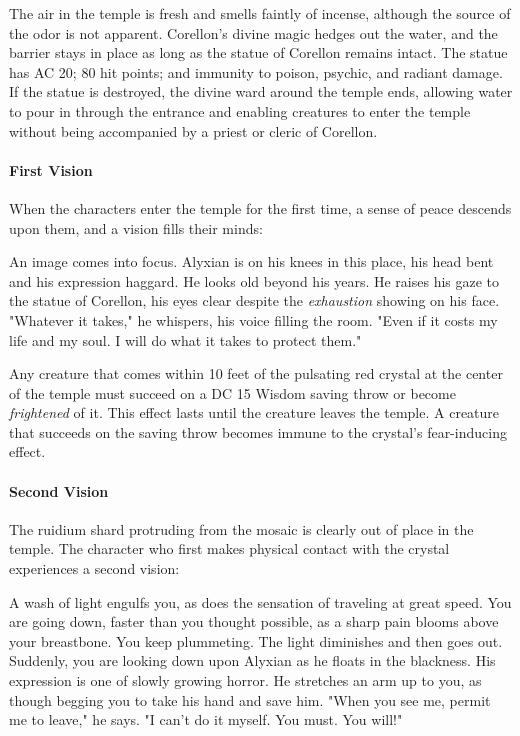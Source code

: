 \documentclass[letterpaper, 11pt, bg=full, twocolumn]{dndbook}
\begin{document}
The air in the temple is fresh and smells faintly of incense, although the source of the odor is not apparent. Corellon's divine magic hedges out the water, and the barrier stays in place as long as the statue of Corellon remains intact. The statue has AC 20; 80 hit points; and immunity to poison, psychic, and radiant damage. If the statue is destroyed, the divine ward around the temple ends, allowing water to pour in through the entrance and enabling creatures to enter the temple without being accompanied by a priest or cleric of Corellon.

\paragraph{First Vision}

When the characters enter the temple for the first time, a sense of peace descends upon them, and a vision fills their minds:

\begin{DndReadAloud}
An image comes into focus. Alyxian is on his knees in this place, his head bent and his expression haggard. He looks old beyond his years. He raises his gaze to the statue of Corellon, his eyes clear despite the \textit{exhaustion} showing on his face.
"Whatever it takes," he whispers, his voice filling the room. "Even if it costs my life and my soul. I will do what it takes to protect them."
\end{DndReadAloud}

Any creature that comes within 10 feet of the pulsating red crystal at the center of the temple must succeed on a DC 15 Wisdom saving throw or become \textit{frightened} of it. This effect lasts until the creature leaves the temple. A creature that succeeds on the saving throw becomes immune to the crystal's fear-inducing effect.

\paragraph{Second Vision}

The ruidium shard protruding from the mosaic is clearly out of place in the temple. The character who first makes physical contact with the crystal experiences a second vision:

\begin{DndReadAloud}
A wash of light engulfs you, as does the sensation of traveling at great speed. You are going down, faster than you thought possible, as a sharp pain blooms above your breastbone. You keep plummeting. The light diminishes and then goes out.
Suddenly, you are looking down upon Alyxian as he floats in the blackness. His expression is one of slowly growing horror. He stretches an arm up to you, as though begging you to take his hand and save him.
"When you see me, permit me to leave," he says. "I can't do it myself. You must. You will!"
\end{DndReadAloud}
\end{document}

